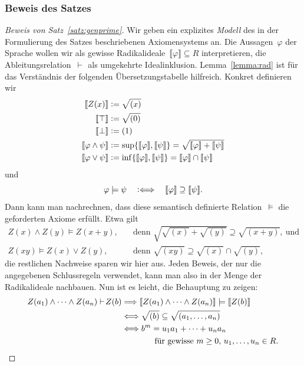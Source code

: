 \documentclass[a4paper,ngerman,12pt]{scrartcl}
\theoremstyle{definition}
\theoremstyle{plain}
\theoremstyle{remark}
\newcommand{\brak}[1]{\llbracket {#1} \rrbracket}
\newcommand{\seq}[1]{\mathrel{\vdash\!\!\!_{#1}}}
\renewcommand{\_}{\mathpunct{.}\,}
\newcommand{\?}{\,{:}\,}
\newcommand{\defeq}{\vcentcolon=}
\begin{document}
\subsubsection*{Beweis des Satzes}

\begin{proof}[Beweis von Satz~\ref{satz:genprime}]
Wir geben ein explizites \emph{Modell} des in der Formulierung des Satzes
beschriebenen Axiomensystems an. Die Aussagen~$\varphi$ der Sprache wollen wir als
gewisse Radikalideale~$\brak{\varphi} \subseteq R$ interpretieren, die
Ableitungsrelation~$\seq{}$ als umgekehrte Idealinklusion.
Lemma~\ref{lemma:rad} ist für das Verständnis der folgenden Übersetzungstabelle
hilfreich. Konkret definieren wir
\begin{align*}
  \brak{Z(x)} &\defeq \sqrt{(x)} \\
  \brak{\top} &\defeq \sqrt{(0)} \\
  \brak{\bot} &\defeq (1) \\
  \brak{\varphi \wedge \psi} &\defeq \sup\{\brak{\varphi},\brak{\psi}\} = \sqrt{\brak{\varphi} + \brak{\psi}} \\
  \brak{\varphi \vee \psi} &\defeq \inf\{\brak{\varphi},\brak{\psi}\} = \brak{\varphi} \cap \brak{\psi}
\end{align*}
und
\[ \varphi \models \psi \quad\vcentcolon\Longleftrightarrow\quad
  \brak{\varphi} \supseteq \brak{\psi}. \]
Dann kann man nachrechnen, dass diese semantisch definierte Relation~$\models$
die geforderten Axiome erfüllt. Etwa gilt
\begin{align*}
  Z(x) \wedge Z(y) \models Z(x+y), &
    \quad\text{denn } \sqrt{\sqrt{(x)} + \sqrt{(y)}} \supseteq \sqrt{(x+y)},\ \text{und} \\
  Z(xy) \models Z(x) \vee Z(y), &
    \quad\text{denn } \sqrt{(xy)} \supseteq \sqrt{(x)} \cap \sqrt{(y)},
\end{align*}
die restlichen Nachweise sparen wir hier aus. Jeden Beweis, der nur die
angegebenen Schlussregeln verwendet, kann man also in der Menge der
Radikalideale nachbauen. Nun ist es leicht, die Behauptung zu zeigen:
\begin{align*}
  Z(a_1) \wedge \cdots \wedge Z(a_n) \seq{} Z(b)
  &\Longrightarrow
  \brak{Z(a_1) \wedge \cdots \wedge Z(a_n)} \models \brak{Z(b)} \\
  &\Longleftrightarrow
  \sqrt{(b)} \subseteq \sqrt{(a_1,\ldots,a_n)} \\
  &\Longleftrightarrow
  b^m = u_1 a_1 + \cdots + u_n a_n \\
  &\qquad\qquad
    \text{für gewisse~$m \geq 0$, $u_1,\ldots,u_n \in R$.} \qedhere
\end{align*}
\end{proof}
\end{document}
